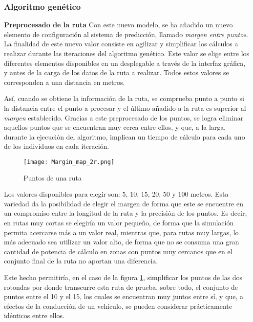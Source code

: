 \documentclass[11pt,spanish,listoffigures,listoftables]{tfgetsinf}
\begin{document}
\subsubsection{Algoritmo genético}
\label{section:adv_gen_alg}
\noindent\textbf{Preprocesado de la ruta}\newline
\label{Adv_AG}
Con este nuevo modelo, se ha añadido un nuevo elemento de configuración al sistema de predicción, llamado  \textit{margen entre puntos}. La finalidad de este nuevo valor consiste en agilizar y simplificar los cálculos a realizar durante las iteraciones del algoritmo genético. Este valor se elige entre los diferentes elementos disponibles en un desplegable a través de la interfaz gráfica, y antes de la carga de los datos de la ruta a realizar. Todos estos valores se corresponden a una distancia en metros.

Así, cuando se obtiene la información de la ruta, se comprueba punto a punto si la distancia entre el punto a procesar y el último añadido a la ruta es superior al \textit{margen} establecido. Gracias a este preprocesado de los puntos, se logra eliminar aquellos puntos que se encuentran muy cerca entre ellos, y que, a la larga, durante la ejecución del algoritmo, implican un tiempo de cálculo para cada uno de los individuos en cada iteración.

\begin{figure}[!htb]
    \centering
    \texttt{[image: Margin\_map\_2r.png]}
    \caption{Puntos de una ruta}
    \label{fig:margin_points}
\end{figure}

Los valores disponibles para elegir son: 5, 10, 15, 20, 50 y 100 metros. Esta variedad da la posibilidad de elegir el margen de forma que este se encuentre en un compromiso entre la longitud de la ruta y la precisión de los puntos. Es decir, en rutas muy cortas se elegiría un valor pequeño, de forma que la simulación permita acercarse más a un valor real, mientras que, para rutas muy largas, lo más adecuado sea utilizar un valor alto, de forma que no se consuma una gran cantidad de potencia de cálculo en zonas con puntos muy cercanos que en el conjunto final de la ruta no aportan una diferencia.\newline

Este hecho permitiría, en el caso de la figura \ref{fig:margin_points}, simplificar los puntos de las dos rotondas por donde transcurre esta ruta de prueba, sobre todo, el conjunto de puntos entre el 10 y el 15, los cuales se encuentran muy juntos entre sí, y que, a efectos de la conducción de un vehículo, se pueden considerar prácticamente idénticos entre ellos.
\end{document}
